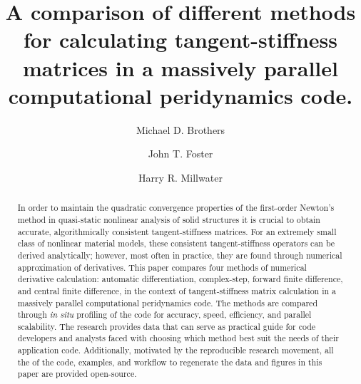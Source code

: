 \documentclass[preprint,12pt]{elsarticle}
\begin{document}
\begin{frontmatter}


\author{Michael D. Brothers}
\author{John T. Foster}

\author{Harry R. Millwater\corref{}}
\address{Mechanical Engineering Department, The University of Texas at San Antonio}


\title{A comparison of different methods for calculating tangent-stiffness matrices in a massively parallel computational peridynamics code.}


\begin{abstract} %
In order to maintain the quadratic convergence properties of the first-order Newton's method in quasi-static nonlinear analysis of solid structures it is crucial to obtain accurate, algorithmically consistent tangent-stiffness matrices. For an extremely small class of nonlinear material models, these consistent tangent-stiffness operators can be derived analytically; however, most often in practice, they are found through numerical approximation of derivatives.  This paper compares four methods of numerical derivative calculation: automatic differentiation, complex-step, forward finite difference, and central finite difference, in the context of tangent-stiffness matrix calculation in a massively parallel computational peridynamics code.  The methods are compared through \emph{in situ} profiling of the code for accuracy, speed, efficiency, and parallel scalability.  The research provides data that can serve as practical guide for code developers and analysts faced with choosing which method best suit the needs of their application code.  Additionally, motivated by the reproducible research movement, all the of the code, examples, and workflow to regenerate the data and figures in this paper are provided open-source.
\end{abstract}


\end{frontmatter}
\end{document}
